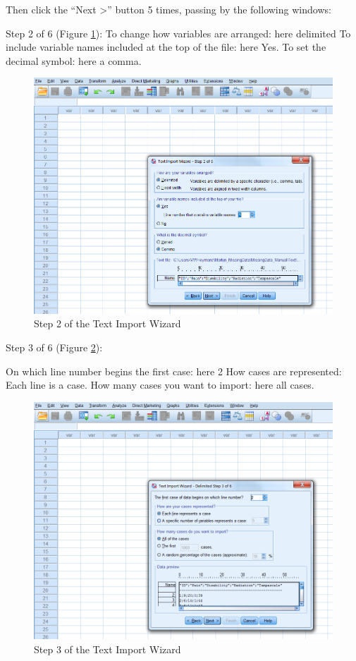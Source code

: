 \documentclass[]{book}
\begin{document}
Then click the ``Next \textgreater{}'' button 5 times, passing by the
following windows:

Step 2 of 6 (Figure \ref{fig:fig20}): To change how variables are
arranged: here delimited To include variable names included at the top
of the file: here Yes. To set the decimal symbol: here a comma.

\begin{figure}

{\centering \includegraphics[width=0.95\linewidth]{images/fig1.20} 

}

\caption{Step 2 of the Text Import Wizard}\label{fig:fig20}
\end{figure}

Step 3 of 6 (Figure \ref{fig:fig21}):

On which line number begins the first case: here 2 How cases are
represented: Each line is a case. How many cases you want to import:
here all cases.

\begin{figure}

{\centering \includegraphics[width=0.95\linewidth]{images/fig1.21} 

}

\caption{Step 3 of the Text Import Wizard}\label{fig:fig21}
\end{figure}
\end{document}
